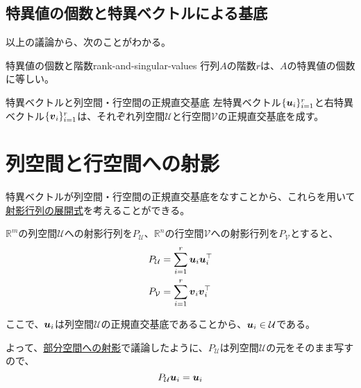 \documentclass[../../../topic_linear-algebra]{subfiles}
\begin{document}
\subsection{特異値の個数と特異ベクトルによる基底}

以上の議論から、次のことがわかる。

\begin{theorem}{特異値の個数と階数}{rank-and-singular-values}
  行列$A$の階数$r$は、$A$の特異値の個数に等しい。
\end{theorem}

\begin{theorem*}{特異ベクトルと列空間・行空間の正規直交基底}
  左特異ベクトル$\{\vb*{u}_i\}_{i=1}^r$と右特異ベクトル$\{\vb*{v}_i\}_{i=1}^r$は、それぞれ列空間$\mathcal{U}$と行空間$\mathcal{V}$の正規直交基底を成す。
\end{theorem*}

\sectionline
\section{列空間と行空間への射影}

特異ベクトルが列空間・行空間の正規直交基底をなすことから、これらを用いて\hyperref[sec:projection-matrix-expansion]{射影行列の展開式}を考えることができる。

\br

$\mathbb{R}^m$の列空間$\mathcal{U}$への射影行列を$P_{\mathcal{U}}$、$\mathbb{R}^n$の行空間$\mathcal{V}$への射影行列を$P_{\mathcal{V}}$とすると、
\begin{align*}
  P_{\mathcal{U}} & = \sum_{i=1}^r \vb*{u}_i \vb*{u}_i^\top \\
  P_{\mathcal{V}} & = \sum_{i=1}^r \vb*{v}_i \vb*{v}_i^\top
\end{align*}

\br

ここで、$\vb*{u}_i$は列空間$\mathcal{U}$の正規直交基底であることから、$\vb*{u}_i \in \mathcal{U}$である。

よって、\hyperref[sec:projection-onto-subspace]{部分空間への射影}で議論したように、$P_{\mathcal{U}}$は列空間$\mathcal{U}$の元をそのまま写すので、
\begin{equation*}
  P_{\mathcal{U}}\vb*{u}_i = \vb*{u}_i
\end{equation*}
\end{document}
